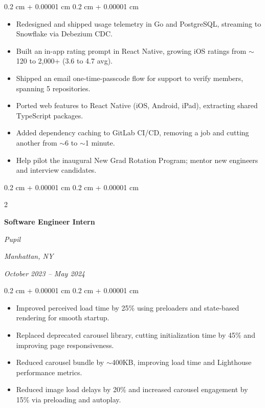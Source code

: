 \documentclass[10pt, letterpaper]{article}
\newenvironment{highlights}{
    \begin{itemize}[
        topsep=0.10 cm,
        parsep=0.10 cm,
        partopsep=0pt,
        itemsep=0pt,
        leftmargin=0.4 cm + 10pt
    ]
}{
    \end{itemize}
} %
\newenvironment{onecolentry}{
    \begin{adjustwidth}{
        0.2 cm + 0.00001 cm
    }{
        0.2 cm + 0.00001 cm
    }
}{
    \end{adjustwidth}
} %
\newenvironment{twocolentry}[2][]{
    \onecolentry
    \def\secondColumn{#2}
    \setcolumnwidth{\fill, 4.5 cm}
    \begin{paracol}{2}
}{
    \switchcolumn \raggedleft \secondColumn
    \end{paracol}
    \endonecolentry
} %
\begin{document}
        \begin{onecolentry}
            \begin{highlights}
                \item Redesigned and shipped usage telemetry in Go and PostgreSQL, streaming to Snowflake via Debezium CDC.
                \item Built an in-app rating prompt in React Native, growing iOS ratings from $\sim$120 to 2,000+ (3.6 to 4.7 avg).
                \item Shipped an email one-time-passcode flow for support to verify members, spanning 5 repositories.
                \item Ported web features to React Native (iOS, Android, iPad), extracting shared TypeScript packages.
                \item Added dependency caching to GitLab CI/CD, removing a job and cutting another from $\sim$6 to $\sim$1 minute.
                \item Help pilot the inaugural New Grad Rotation Program; mentor new engineers and interview candidates.
            \end{highlights}
        \end{onecolentry}

        \vspace{0.2 cm}

        \begin{twocolentry}{
        \textit{Manhattan, NY}    
            
        \textit{October 2023 – May 2024}}
            \textbf{Software Engineer Intern}
            
            \textit{Pupil}
        \end{twocolentry}

        \begin{onecolentry}
            \begin{highlights}
                \item Improved perceived load time by 25\% using preloaders and state-based rendering for smooth startup.
                \item Replaced deprecated carousel library, cutting initialization time by 45\% and improving page responsiveness.
                \item Reduced carousel bundle by $\sim$400KB, improving load time and Lighthouse performance metrics.
                \item Reduced image load delays by 20\% and increased carousel engagement by 15\% via preloading and autoplay.
            \end{highlights}
        \end{onecolentry}
\end{document}
